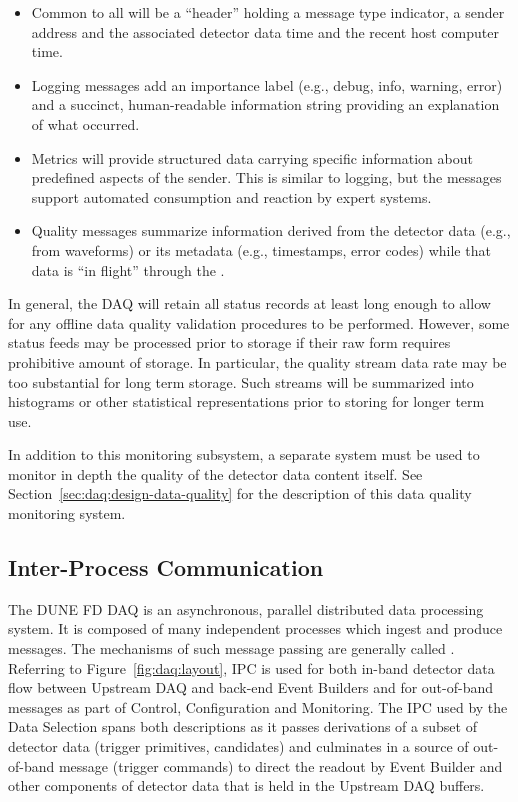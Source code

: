 \begin{itemize}
\item Common to all will be a ``header'' holding a message type indicator, a
  sender address and the associated detector data time and the recent host
  computer time.
 
\item Logging messages add an importance label (e.g., debug, info, warning,
  error) and a succinct, human-readable information string providing an
  explanation of what occurred.
  
\item Metrics will provide structured data carrying specific information about
  predefined aspects of the sender. 
  This is similar to logging, but the messages support automated consumption and
  reaction by expert systems.  

\item Quality messages summarize information derived from the detector data
  (e.g., from waveforms) or its metadata (e.g., timestamps, error codes) while
  that data is ``in flight'' through the .

\end{itemize}

In general, the DAQ will retain all status records at least long enough to allow
for any offline data quality validation procedures to be performed. 
However, some status feeds may be processed prior to storage if their raw form
requires prohibitive amount of storage. 
In particular, the quality stream data rate may be too substantial for long term
storage. 
Such streams will be summarized into histograms or other statistical
representations prior to storing for longer term use.

In addition to this   monitoring subsystem, a separate
system must be used to monitor in depth the quality of the detector data content
itself. 
See Section~\ref{sec:daq:design-data-quality} for the description of this data
quality monitoring system.

\subsection{Inter-Process Communication}
\label{sec:daq:design-ipc}

The DUNE FD DAQ is an asynchronous, parallel distributed data processing system. 
It is composed of many independent processes which ingest and produce messages. 
The mechanisms of such message passing are generally called . 
Referring to Figure~\ref{fig:daq:layout}, IPC is used for both in-band detector
data flow between Upstream DAQ and back-end Event Builders and for out-of-band
messages as part of Control, Configuration and Monitoring. 
The IPC used by the Data Selection spans both descriptions as it passes
derivations of a subset of detector data (trigger primitives, candidates) and
culminates in a source of out-of-band message (trigger commands) to direct the
readout by Event Builder and other components of detector data that is held in
the Upstream DAQ buffers.

